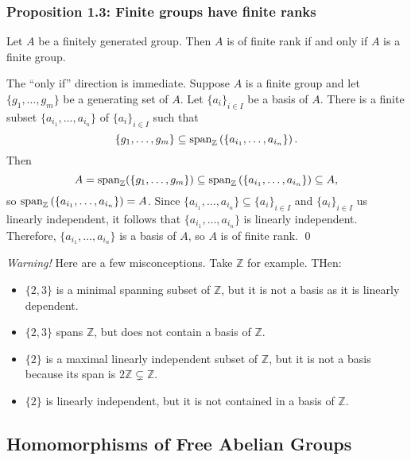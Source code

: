 \documentclass{article}
\renewenvironment{proof}{{\bfseries\color{blue1} Proof:}}{\qed}
\begin{document}
\subsubsection{Proposition 1.3: Finite groups have finite ranks}
\begin{idea}
    Let $A$ be a finitely generated group. Then $A$ is of finite rank if and only if $A$ is a finite group.
\end{idea}
\begin{proof}
    The ``only if'' direction is immediate. Suppose $A$ is a finite group and let $\{g_1,\dots,g_m\}$ be a generating set of $A$. Let $\{a_i\}_{i \in I}$ be a basis of $A$. There is a finite subset $\{a_{i_1},\dots,a_{i_n}\}$ of $\{a_i\}_{i\in I}$ such that
    \begin{equation*}
        \{g_1,\dots,g_m\} \subseteq \mathrm{span}_{\mathbb{Z}}\left(\left\{a_{i_1},\dots,a_{i_n}\right\}\right).
    \end{equation*}
    Then
    \begin{equation*}
        A = \mathrm{span}_{\mathbb{Z}}(\{g_1,\dots,g_m\}) \subseteq \mathrm{span}_{\mathbb{Z}}\left(\left\{a_{i_1},\dots,a_{i_n}\right\}\right) \subseteq A,
    \end{equation*}
    so $\mathrm{span}_{\mathbb{Z}}\left(\left\{a_{i_1},\dots,a_{i_n}\right\}\right) = A$. Since $\{a_{i_1},\dots,a_{i_n}\} \subseteq \{a_i\}_{i \in I}$ and $\{a_i\}_{i\in I}$ us linearly independent, it follows that $\{a_{i_1},\dots,a_{i_n}\}$ is linearly independent. Therefore, $\{a_{i_1},\dots,a_{i_n}\}$ is a basis of $A$, so $A$ is of finite rank.
\end{proof}
\vspace{2mm}

\textit{Warning!} Here are a few misconceptions. Take $\mathbb{Z}$ for example. THen:
\begin{itemize}
    \item $\{2,3\}$ is a minimal spanning subset of $\mathbb{Z}$, but it is not a basis as it is linearly dependent.
    \item $\{2,3\}$ spans $\mathbb{Z}$, but does not contain a basis of $\mathbb{Z}$.
    \item $\{2\}$ is a maximal linearly independent subset of $\mathbb{Z}$, but it is not a basis because its span is $2\mathbb{Z} \subsetneq
              \mathbb{Z}$.
    \item $\{2\}$ is linearly independent, but it is not contained in a basis of $\mathbb{Z}$.
\end{itemize}
\subsection{Homomorphisms of Free Abelian Groups}
\end{document}
